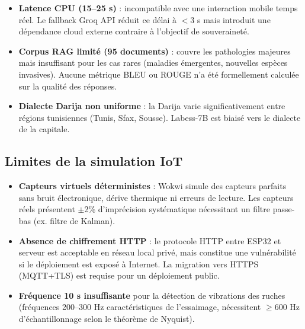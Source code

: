 \documentclass[12pt,a4paper,oneside]{report}
\begin{document}
\begin{tcolorbox}[warningbox,title={Limites de l'assistant souverain}]
\begin{itemize}
  \item \textbf{Latence CPU (15--25 s)} : incompatible avec une interaction mobile
        temps réel. Le fallback Groq API réduit ce délai à $<$3 s mais introduit une
        dépendance cloud externe contraire à l'objectif de souveraineté.
  \item \textbf{Corpus RAG limité (95 documents)} : couvre les pathologies majeures
        mais insuffisant pour les cas rares (maladies émergentes, nouvelles espèces
        invasives). Aucune métrique BLEU ou ROUGE n'a été formellement calculée sur la
        qualité des réponses.
  \item \textbf{Dialecte Darija non uniforme} : la Darija varie significativement entre
        régions tunisiennes (Tunis, Sfax, Sousse). Labess-7B est biaisé vers le dialecte
        de la capitale.
\end{itemize}
\end{tcolorbox}

\subsection{Limites de la simulation IoT}

\begin{tcolorbox}[warningbox,title={Wokwi vs matériel réel}]
\begin{itemize}
  \item \textbf{Capteurs virtuels déterministes} : Wokwi simule des capteurs parfaits
        sans bruit électronique, dérive thermique ni erreurs de lecture. Les capteurs
        réels présentent $\pm$2\% d'imprécision systématique nécessitant un filtre
        passe-bas (ex. filtre de Kalman).
  \item \textbf{Absence de chiffrement HTTP} : le protocole HTTP entre ESP32 et
        serveur est acceptable en réseau local privé, mais constitue une vulnérabilité
        si le déploiement est exposé à Internet. La migration vers HTTPS (MQTT+TLS)
        est requise pour un déploiement public.
  \item \textbf{Fréquence 10 s insuffisante} pour la détection de vibrations des ruches
        (fréquences 200--300 Hz caractéristiques de l'essaimage, nécessitent $\geq$600 Hz
        d'échantillonnage selon le théorème de Nyquist).
\end{itemize}
\end{tcolorbox}
\end{document}
